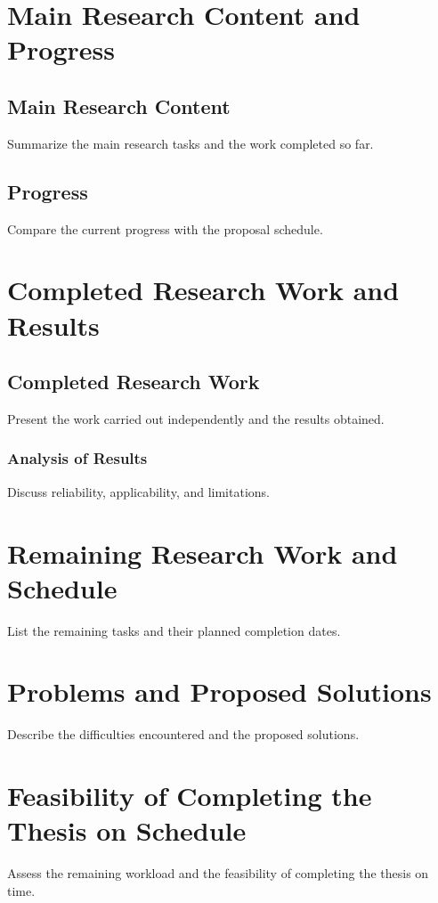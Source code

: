\section{Main Research Content and Progress}
\subsection{Main Research Content}
Summarize the main research tasks and the work completed so far.
\subsection{Progress}
Compare the current progress with the proposal schedule.
\section{Completed Research Work and Results}
\subsection{Completed Research Work}
Present the work carried out independently and the results obtained.
\subsubsection{Analysis of Results}
Discuss reliability, applicability, and limitations.
\section{Remaining Research Work and Schedule}
List the remaining tasks and their planned completion dates.
\section{Problems and Proposed Solutions}
Describe the difficulties encountered and the proposed solutions.
\section{Feasibility of Completing the Thesis on Schedule}
Assess the remaining workload and the feasibility of completing the thesis on time.
